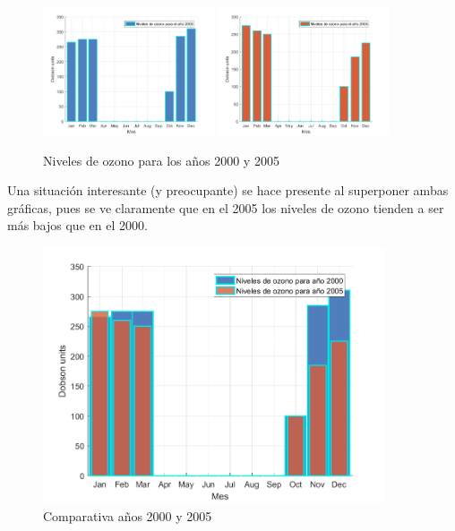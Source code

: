 \documentclass[a4paper]{article}
\begin{document}
\begin{figure}[h!]
\centering
\includegraphics[width=0.45\textwidth]{assets/PS2000.png}
\includegraphics[width=0.45\textwidth]{assets/PS2005.png}
\caption{\label{fig:ps2000y2005}Niveles de ozono para los años 2000 y 2005}
\end{figure}

Una situación interesante (y preocupante) se hace presente al superponer ambas gráficas, pues se ve claramente que en el 2005 los niveles de ozono tienden a ser más bajos que en el 2000.

\begin{figure}[h!]
\centering
\includegraphics[width=0.9\textwidth]{assets/PS2000vs2005.png}
\caption{\label{fig:ps2000vs2005}Comparativa años 2000 y 2005}
\end{figure}
\end{document}
